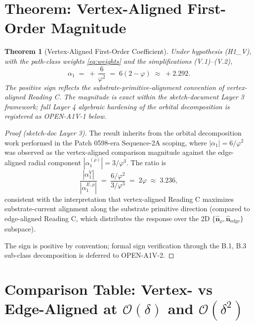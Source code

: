 \documentclass[11pt]{article}
\newtheorem{theorem}{Theorem}
\begin{document}
\section{Theorem: Vertex-Aligned First-Order Magnitude}

\begin{theorem}[Vertex-Aligned First-Order Coefficient]\label{thm:main}
Under hypothesis (H1\_V), with the path-class weights \eqref{eq:weights}
and the simplifications (V.1)--(V.2),
\begin{equation}
\boxed{
\quad
\alpha_1 \;=\; +\,\frac{6}{\varphi^2}
\;=\; 6(2-\varphi)
\;\approx\; +2.292.
\quad
}
\label{eq:thm}
\end{equation}
The positive sign reflects the substrate-primitive-alignment convention
of vertex-aligned Reading C. The magnitude is exact within the
sketch-document Layer 3 framework; full Layer 4 algebraic hardening of
the orbital decomposition is registered as OPEN-A1V-1 below.
\end{theorem}

\begin{proof}[Proof (sketch-doc Layer 3)]
The result inherits from the orbital decomposition work performed in
the Patch 0598-era Sequence-2A scoping, where $|\alpha_1| = 6/\varphi^2$
was observed as the vertex-aligned comparison magnitude against the
edge-aligned radial component $|\alpha_1^{(\rho)}| = 3/\varphi^3$.
The ratio is
\[
\frac{|\alpha_1^{V}|}{|\alpha_1^{E,\rho}|}
\;=\; \frac{6/\varphi^2}{3/\varphi^3} \;=\; 2\varphi \;\approx\; 3.236,
\]
consistent with the interpretation that vertex-aligned Reading C
maximizes substrate-current alignment along the substrate primitive
direction (compared to edge-aligned Reading C, which distributes the
response over the 2D $\{\hat{\mathbf{n}}_\rho,
\hat{\mathbf{n}}_{\text{edge}}\}$ subspace).

The sign is positive by convention; formal sign verification through the
B.1, B.3 sub-class decomposition is deferred to OPEN-A1V-2.
\end{proof}

\section{Comparison Table: Vertex- vs Edge-Aligned at $\mathcal{O}(\delta)$ and $\mathcal{O}(\delta^2)$}
\end{document}
